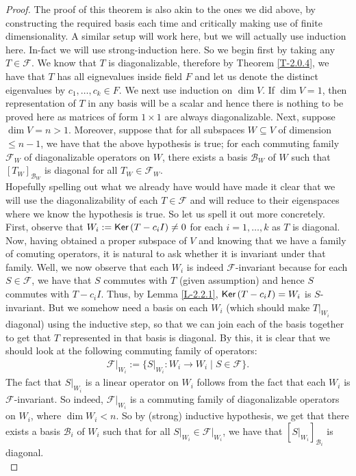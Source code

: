 \documentclass[letterpaper,11pt,twoside]{article}
\theoremstyle{definition}
\theoremstyle{definition}
\theoremstyle{definition}
\theoremstyle{definition}
\theoremstyle{definition}
\theoremstyle{definition}
\theoremstyle{remark}
\theoremstyle{definition}
\newcommand{\Ker}[1]{{\fontfamily{lmss}\selectfont 
		\text{Ker}\left (#1\right )
}}
\newcommand{\rest}[2]{\left. { #1 }\right \vert_{#2}}
\begin{document}
    \begin{proof}
    The proof of this theorem is also akin to the ones we did above, by constructing the required basis each time and critically making use of finite dimensionality. A similar setup will work here, but we will actually use induction here. In-fact we will use strong-induction here. So we begin first by taking any $T\in \mathcal{F}$. We know that $T$ is diagonalizable, therefore by Theorem \ref{T-2.0.4}, we have that $T$ has all eignevalues inside field $F$ and let us denote the distinct eigenvalues by $c_1,\dots,c_k\in F$. We next use induction on $\dim V$. If $\dim V = 1$, then representation of $T$ in any basis will be a scalar and hence there is nothing to be proved here as matrices of form $1\times 1$ are always diagonalizable. Next, suppose $\dim V =n >1$. Moreover, suppose that for all subspaces $W\subseteq V$ of dimension $\le n-1$, we have that the above hypothesis is true; for each commuting family $ \mathcal{F}_W$ of diagonalizable operators on $W$, there exists a basis $ \mathcal{B}_W$ of $W$ such that $[T_W]_{ \mathcal{B}_W}$ is diagonal for all $T_W\in \mathcal{F}_W$. \\
    
    Hopefully spelling out what we already have would have made it clear that we will use the diagonalizability of each $T\in  \mathcal{F}$ and will reduce to their eigenspaces where we know the hypothesis is true. So let us spell it out more concretely. First, observe that $W_i := \Ker{T-c_iI}\neq 0$ for each $i=1,\dots,k$ as $T$ is diagonal. Now, having obtained a proper subspace of $V$ and knowing that we have a family of comuting operators, it is natural to ask whether it is invariant under that family. Well, we now observe that each $W_i$ is indeed $  \mathcal{F}$-invariant because for each $S\in  \mathcal{F}$, we have that $S$ commutes with $T$ (given assumption) and hence $S$ commutes with $T-c_iI$. Thus, by Lemma \ref{L-2.2.1}, $\Ker{T-c_iI} = W_i$ is $S$-invariant. But we somehow need a basis on each $W_i$ (which should make $\rest{T}{W_i}$ diagonal) using the inductive step, so that we can join each of the basis together to get that $T$ represented in that basis is diagonal. By this, it is clear that we should look at the following commuting family of operators:
    \begin{align*}
        \rest{ \mathcal{F}}{W_i} := \{\rest{S}{W_i} : W_i \to W_i\;\vert\; S\in  \mathcal{F}\}.
    \end{align*}
    The fact that $\rest{S}{W_i} $ is a linear operator on $W_i$ follows from the fact that each $W_i$ is $ \mathcal{F}$-invariant. So indeed, $\rest{ \mathcal{F}}{W_i}$ is a commuting family of diagonalizable operators on $W_i$, where $\dim W_i < n$. So by (strong) inductive hypothesis, we get that there exists a basis $ \mathcal{B}_{i}$ of $W_i$ such that for all $\rest{S}{W_i}\in \rest{ \mathcal{F}}{W_i}$, we have that $[\rest{S}{W_i}]_{ \mathcal{B}_i}$ is diagonal.\\
    

\end{proof}
\end{document}
